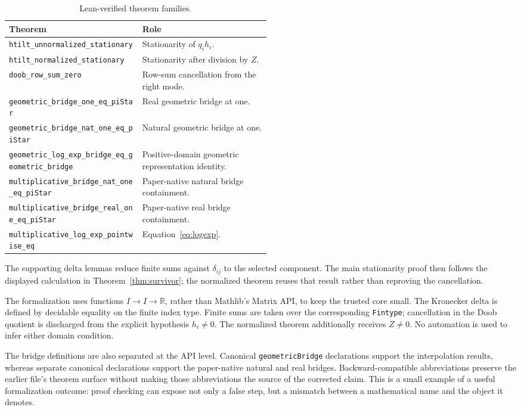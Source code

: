 \documentclass[10pt]{article}
\newcommand{\R}{\mathbb{R}}
\begin{document}
\begin{table}[ht]
\centering
\scriptsize
\caption{Lean-verified theorem families.}
\label{tab:lean}
\begin{tabularx}{\linewidth}{@{}p{0.51\linewidth}X@{}}
\toprule
Theorem & Role\\
\midrule
\texttt{htilt\_unnormalized\_stationary} & Stationarity of \(q_i h_i\).\\
\texttt{htilt\_normalized\_stationary} & Stationarity after division by \(Z\).\\
\texttt{doob\_row\_sum\_zero} & Row-sum cancellation from the right mode.\\
\texttt{geometric\_bridge\_one\_eq\_piStar} & Real geometric bridge at one.\\
\texttt{geometric\_bridge\_nat\_one\_eq\_piStar} & Natural geometric bridge at one.\\
\texttt{geometric\_log\_exp\_bridge\_eq\_geometric\_bridge} & Positive-domain geometric representation identity.\\
\texttt{multiplicative\_bridge\_nat\_one\_eq\_piStar} & Paper-native natural bridge containment.\\
\texttt{multiplicative\_bridge\_real\_one\_eq\_piStar} & Paper-native real bridge containment.\\
\texttt{multiplicative\_log\_exp\_pointwise\_eq} & Equation~\eqref{eq:logexp}.\\
\bottomrule
\end{tabularx}
\end{table}

The supporting delta lemmas reduce finite sums against \(\delta_{ij}\) to the
selected component. The main stationarity proof then follows the displayed
calculation in Theorem~\ref{thm:survivor}; the normalized theorem reuses that
result rather than reproving the cancellation.

The formalization uses functions \(I\to I\to\R\), rather than Mathlib's Matrix
API, to keep the trusted core small. The Kronecker delta is defined by decidable
equality on the finite index type. Finite sums are taken over the corresponding
\texttt{Fintype}; cancellation in the Doob quotient is discharged from the
explicit hypothesis \(h_i\ne0\). The normalized theorem additionally receives
\(Z\ne0\). No automation is used to infer either domain condition.

The bridge definitions are also separated at the API level. Canonical
\texttt{geometricBridge} declarations support the interpolation results,
whereas separate canonical declarations support the paper-native natural and
real bridges. Backward-compatible abbreviations preserve the earlier file's
theorem surface without making those abbreviations the source of the corrected claim.
This is a small example of a useful formalization outcome: proof checking can
expose not only a false step, but a mismatch between a mathematical name and
the object it denotes.
\end{document}
